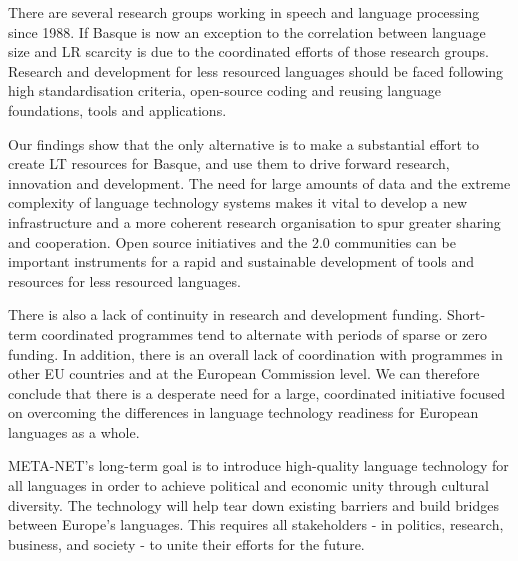 \begin{multicols}{2}
There are several research groups working in speech and language processing since 1988. If Basque is now an exception to the correlation between language size and LR scarcity is due to the coordinated efforts of those research groups. Research and development for less resourced languages should be faced following high standardisation criteria, open-source coding and reusing   language foundations, tools and applications. 

    Our findings show that the only alternative is to make a substantial effort to create LT resources for Basque, and use them to drive forward research, innovation and development. The need for large amounts of data and the extreme complexity of language technology systems makes it vital to develop a new infrastructure and a more coherent research organisation to spur greater sharing and cooperation. Open source initiatives and the 2.0 communities can be important instruments for a rapid and sustainable development of tools and resources for less resourced languages.

   There is also a lack of continuity in research and development funding. Short-term coordinated programmes tend to alternate with periods of sparse or zero funding. In addition, there is an overall lack of coordination with programmes in other EU countries and at the European Commission level. We can therefore conclude that there is a desperate need for a large, coordinated initiative focused on overcoming the differences in language technology readiness for European languages as a whole.

    META-NET’s long-term goal is to introduce high-quality language technology for all languages in order to achieve political and economic unity through cultural diversity. The technology will help tear down existing barriers and build bridges between Europe’s languages. This requires all stakeholders - in politics, research, business, and society - to unite their efforts for the future. 
\end{multicols}

\clearpage



